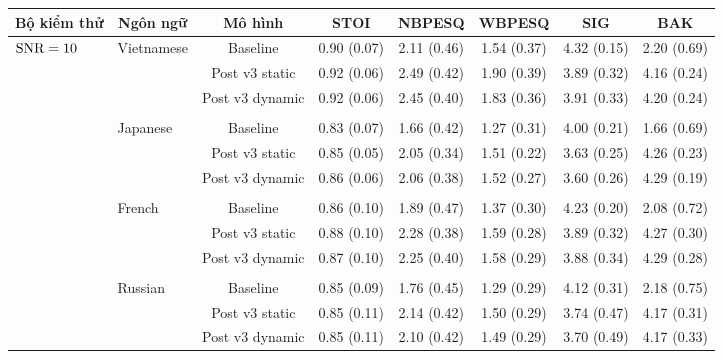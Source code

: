 		\begin{sidewaystable} \ContinuedFloat
			\centering
			\begin{subtable}{\textwidth}
				\centering
				\begin{tabular}{llcccccc}
					\hline
					\multicolumn{1}{c}{\textbf{Bộ kiểm thử}}	& \multicolumn{1}{c}{\textbf{Ngôn ngữ}}	& \textbf{Mô hình}	& \textbf{STOI}	& \textbf{NBPESQ}	& \textbf{WBPESQ}	& \textbf{SIG}	& \textbf{BAK} \\
					\hline
					\multirow{27}{*}{$\text{SNR}=10$}       & \multirow{3}{*}{Vietnamese}     &Baseline       & 0.90 (0.07)   & 2.11 (0.46)   & 1.54 (0.37)   & 4.32 (0.15)   & 2.20 (0.69) \\
					&               &Post v3 static & 0.92 (0.06)   & 2.49 (0.42)   & 1.90 (0.39)   & 3.89 (0.32)   & 4.16 (0.24) \\
					&				&Post v3 dynamic        & 0.92 (0.06)   & 2.45 (0.40)   & 1.83 (0.36)   & 3.91 (0.33)   & 4.20 (0.24) \\
					&&&&&&&\\
					& \multirow{3}{*}{Japanese}     &Baseline       & 0.83 (0.07)   & 1.66 (0.42)   & 1.27 (0.31)   & 4.00 (0.21)   & 1.66 (0.69) \\
					&               &Post v3 static & 0.85 (0.05)   & 2.05 (0.34)   & 1.51 (0.22)   & 3.63 (0.25)   & 4.26 (0.23) \\
					&               &Post v3 dynamic        & 0.86 (0.06)   & 2.06 (0.38)   & 1.52 (0.27)   & 3.60 (0.26)   & 4.29 (0.19) \\
					&&&&&&&\\
					& \multirow{3}{*}{French}       &Baseline       & 0.86 (0.10)   & 1.89 (0.47)   & 1.37 (0.30)   & 4.23 (0.20)   & 2.08 (0.72) \\
					&               &Post v3 static & 0.88 (0.10)   & 2.28 (0.38)   & 1.59 (0.28)   & 3.89 (0.32)   & 4.27 (0.30) \\
					&               &Post v3 dynamic        & 0.87 (0.10)   & 2.25 (0.40)   & 1.58 (0.29)   & 3.88 (0.34)   & 4.29 (0.28) \\
					&&&&&&&\\
					& \multirow{3}{*}{Russian}      &Baseline       & 0.85 (0.09)   & 1.76 (0.45)   & 1.29 (0.29)   & 4.12 (0.31)   & 2.18 (0.75) \\
					&               &Post v3 static & 0.85 (0.11)   & 2.14 (0.42)   & 1.50 (0.29)   & 3.74 (0.47)   & 4.17 (0.31) \\
					&               &Post v3 dynamic        & 0.85 (0.11)   & 2.10 (0.42)   & 1.49 (0.29)   & 3.70 (0.49)   & 4.17 (0.33) \\

\end{tabular}
\end{subtable}
\end{sidewaystable}
